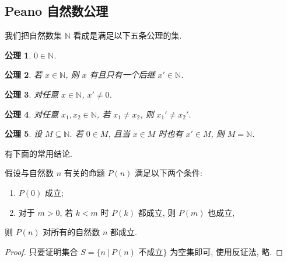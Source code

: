 \documentclass[
    color=black,
    device=normal,
    lang=cn
]{elegantnote}
\newtheorem{axiom}{公理}[subsection]
\begin{document}
\subsection{Peano 自然数公理}
我们把自然数集 $\mathbb{N}$ 看成是满足以下五条公理的集.
\begin{axiom}
    $0\in\mathbb{N}$.
\end{axiom}
\begin{axiom}
    若 $x\in \mathbb{N}$, 则 $x$ 有且只有一个后继 $x'\in\mathbb{N}$.
\end{axiom}
\begin{axiom}
    对任意 $x\in\mathbb{N}$, $x'\neq0$.
\end{axiom}
\begin{axiom}
    对任意 $x_1,x_2\in \mathbb{N}$, 若 $x_1\neq x_2$, 则 $x_1'\neq x_2'$.
\end{axiom}
\begin{axiom}
    设 $M\subseteq \mathbb{N}$. 若 $0\in M$, 且当 $x\in M$ 时也有 $x'\in M$, 则 $M=\mathbb{N}$.
\end{axiom}
有下面的常用结论.
\begin{theorem}[强归纳法]
    假设与自然数 $n$ 有关的命题 $P(n)$ 满足以下两个条件:
    \begin{enumerate}[label=$\arabic*^\circ$]
        \item $P(0)$ 成立;
        \item 对于 $m>0$, 若 $k<m$ 时 $P(k)$ 都成立, 则 $P(m)$ 也成立,
    \end{enumerate}
    则 $P(n)$ 对所有的自然数 $n$ 都成立.
\end{theorem}
\begin{proof}
    只要证明集合 $S=\{n\ \vert\ P(n)\text{ 不成立}\}$ 为空集即可, 使用反证法, 略.
\end{proof}
\end{document}
